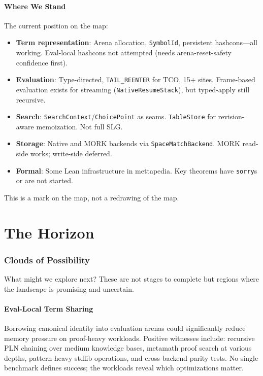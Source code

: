 \documentclass[11pt]{article}
\newcommand{\code}[1]{\texttt{#1}}
\newcommand{\MORK}{\textup{MORK}}
\begin{document}
\subsection{Where We Stand}

The current position on the map:

\begin{itemize}
\item \textbf{Term representation}: Arena allocation, \code{SymbolId},
  persistent hashcons---all working.  Eval-local hashcons not attempted
  (needs arena-reset-safety confidence first).
\item \textbf{Evaluation}: Type-directed, \code{TAIL\_REENTER} for TCO,
  15+ sites.  Frame-based evaluation exists for streaming
  (\code{NativeResumeStack}), but typed-apply still recursive.
\item \textbf{Search}: \code{SearchContext}/\code{ChoicePoint} as seams.
  \code{TableStore} for revision-aware memoization.  Not full SLG.
\item \textbf{Storage}: Native and \MORK{} backends via
  \code{SpaceMatchBackend}.  \MORK{} read-side works; write-side deferred.
\item \textbf{Formal}: Some Lean infrastructure in mettapedia.  Key
  theorems have \code{sorry}s or are not started.
\end{itemize}

This is a mark on the map, not a redrawing of the map.

\part{The Horizon}

\section{Clouds of Possibility}
\label{sec:clouds}

What might we explore next?  These are not stages to complete but
regions where the landscape is promising and uncertain.

\subsection{Eval-Local Term Sharing}

Borrowing canonical identity into evaluation arenas could significantly
reduce memory pressure on proof-heavy workloads.  Positive witnesses include:
recursive PLN chaining over medium knowledge bases, metamath proof search
at various depths, pattern-heavy stdlib operations, and cross-backend parity
tests.  No single benchmark defines success; the workloads reveal which
optimizations matter.
\end{document}
